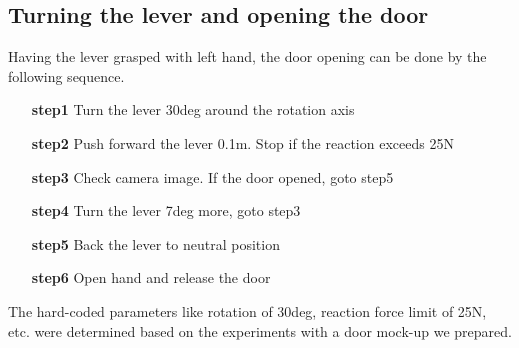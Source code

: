 \subsection{Turning the lever and opening the door}
Having the lever grasped with left hand, the door opening can be done by the following sequence.
%
\begin{itemize}
\item[{\bf step1}] Turn the lever 30deg around the rotation axis
\item[{\bf step2}] Push forward the lever 0.1m. Stop if the reaction exceeds 25N
\item[{\bf step3}] Check camera image. If the door opened, goto step5
\item[{\bf step4}] Turn the lever 7deg more, goto step3
\item[{\bf step5}] Back the lever to neutral position
\item[{\bf step6}] Open hand and release the door 
\end{itemize}
%
The hard-coded parameters like rotation of 30deg, reaction force limit of 25N, etc. were 
determined based on the experiments with a door mock-up we prepared.

